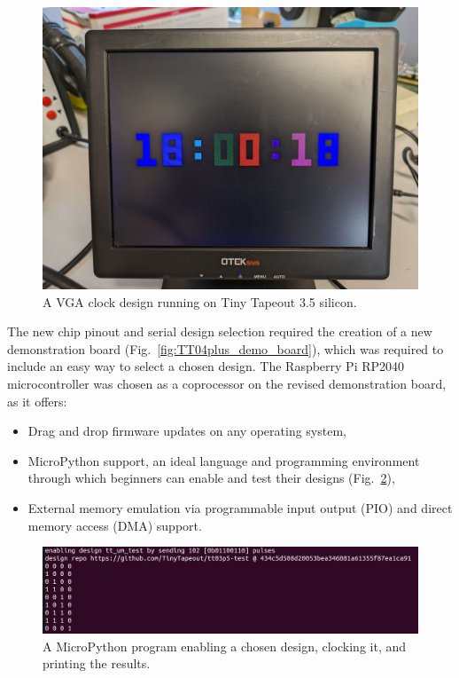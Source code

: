 \begin{figure}[!t]
\centering
\includegraphics[width=\columnwidth]{./Figs/tt3p5 vga clock.jpg}
\caption{A VGA clock design running on Tiny Tapeout 3.5 silicon.}
\label{fig:VGA_clock_design_TT03_5_silicon}
\end{figure}

The new chip pinout and serial design selection required the creation of a new demonstration board (Fig.~\ref{fig:TT04plus_demo_board}), which was required to include an easy way to select a chosen design.
The Raspberry Pi RP2040 microcontroller was chosen as a coprocessor on the revised demonstration board, as it offers:

\begin{itemize}
\item Drag and drop firmware updates on any operating system,
\item MicroPython\cite{micropython} support, an ideal language and programming environment through which beginners can enable and test their designs (Fig.~\ref{fig:micropython_program}),
\item External memory emulation via programmable input output (PIO) and direct memory access (DMA) support.
\end{itemize}

\begin{figure}[!t]
\centering
\includegraphics[width=\columnwidth]{./Figs/tt3p5 enable design.png}
\caption{A MicroPython program\cite{demofirmwaretest} enabling a chosen design, clocking it, and printing the results.}
\label{fig:micropython_program}
\end{figure}


